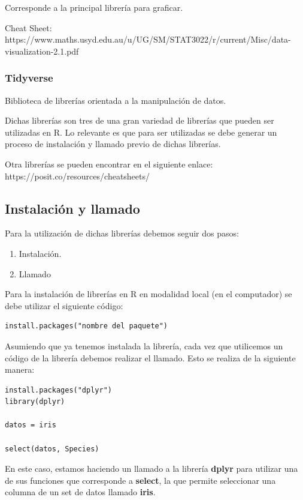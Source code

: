 \documentclass[
  letterpaper,
  DIV=11,
  numbers=noendperiod]{scrartcl}
\providecommand{\tightlist}{%
  \setlength{\itemsep}{0pt}\setlength{\parskip}{0pt}}
\begin{document}
Corresponde a la principal librería para graficar.

Cheat Sheet:
https://www.maths.usyd.edu.au/u/UG/SM/STAT3022/r/current/Misc/data-visualization-2.1.pdf

\subsubsection{\texorpdfstring{\textbf{Tidyverse}}{Tidyverse}}\label{tidyverse}

Biblioteca de librerías orientada a la manipulación de datos.

Dichas librerías son tres de una gran variedad de librerías que pueden
ser utilizadas en R. Lo relevante es que para ser utilizadas se debe
generar un proceso de instalación y llamado previo de dichas librerías.

Otra librerías se pueden encontrar en el siguiente enlace:
https://posit.co/resources/cheatsheets/

\subsection{Instalación y llamado}\label{instalaciuxf3n-y-llamado}

Para la utilización de dichas librerías debemos seguir dos pasos:

\begin{enumerate}
\def\labelenumi{\arabic{enumi}.}
\tightlist
\item
  Instalación.
\item
  Llamado
\end{enumerate}

Para la instalación de librerías en R en modalidad local (en el
computador) se debe utilizar el siguiente código:

\begin{verbatim}
install.packages("nombre del paquete")
\end{verbatim}

Asumiendo que ya tenemos instalada la librería, cada vez que utilicemos
un código de la librería debemos realizar el llamado. Esto se realiza de
la siguiente manera:

\begin{verbatim}
install.packages("dplyr")
library(dplyr)

datos = iris

select(datos, Species)
\end{verbatim}

En este caso, estamos haciendo un llamado a la librería \textbf{dplyr}
para utilizar una de sus funciones que corresponde a \textbf{select}, la
que permite seleccionar una columna de un set de datos llamado
\textbf{iris}.
\end{document}

